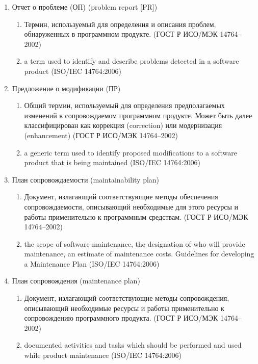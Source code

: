 \begin{enumerate}
    \item Отчет о проблеме (ОП) (problem report [PR])
    \begin{enumerate}
        \item Термин, используемый для определения и описания проблем, обнаруженных в программном продукте.
        (ГОСТ Р ИСО/МЭК 14764--2002)
        \item a term used to identify and describe problems detected in a software product
        (ISO/IEC 14764:2006)
    \end{enumerate}

    \item Предложение о модификации (ПР)
    \begin{enumerate}
        \item Общий термин, используемый для определения предполагаемых изменений в сопровождаемом программном продукте.
        Может быть далее классифицирован как коррекция (correction) или модернизация (enhancement)
        (ГОСТ Р ИСО/МЭК 14764--2002)
        \item a generic term used to identify proposed modifications to a software product that is being maintained
        (ISO/IEC 14764:2006)
    \end{enumerate}

    \item План сопровождаемости (maintainability plan)
    \begin{enumerate}
        \item Документ, излагающий соответствующие методы обеспечения сопровождаемости, описывающий необходимые для этого ресурсы и работы применительно к программным средствам.
        (ГОСТ Р ИСО/МЭК 14764--2002)
        \item the scope of software maintenance, the designation of who will provide maintenance, an estimate of maintenance costs.
        Guidelines for developing a Maintenance Plan
        (ISO/IEC 14764:2006)
    \end{enumerate}

    \item План сопровождения (maintenance plan)
    \begin{enumerate}
        \item Документ, излагающий соответствующие методы сопровождения, описывающий необходимые ресурсы и работы применительно к сопровождению программного продукта.
        (ГОСТ Р ИСО/МЭК 14764--2002)
        \item documented activities and tasks which should be performed and used while product maintenance
        (ISO/IEC 14764:2006)
    \end{enumerate}


\end{enumerate}
